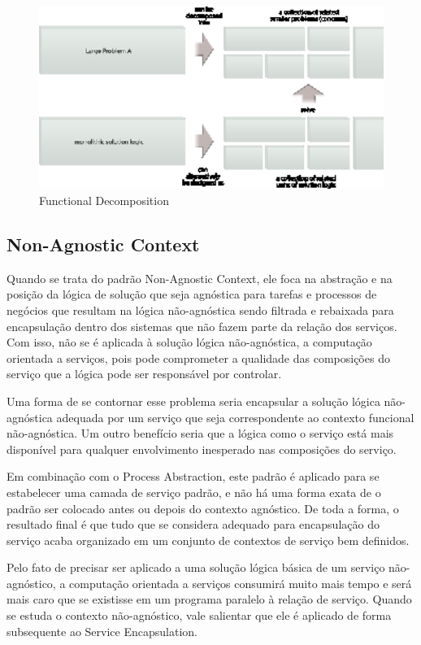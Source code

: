 \documentclass[12pt]{article}
\begin{document}
\begin{figure}[H]
\centering
\includegraphics[width=14cm]{img/fig3.eps}
\caption{Functional Decomposition}
\label{fig:3}
\end{figure}

\subsection{Non-Agnostic Context}

Quando se trata do padrão Non-Agnostic Context, ele foca na abstração e na posição da lógica de solução que seja agnóstica para tarefas e processos de negócios que resultam na lógica não-agnóstica sendo filtrada e rebaixada para encapsulação dentro dos sistemas que não fazem parte da relação dos serviços. Com isso, não se é aplicada à solução lógica não-agnóstica, a computação orientada a serviços, pois pode comprometer a qualidade das composições do serviço que a lógica pode ser responsável por controlar.

Uma forma de se contornar esse problema seria encapsular a solução lógica não-agnóstica adequada por um serviço que seja correspondente ao contexto funcional não-agnóstica. Um outro benefício seria que a lógica como o serviço está mais disponível para qualquer envolvimento inesperado nas composições do serviço.

Em combinação com o Process Abstraction, este padrão é aplicado para se estabelecer uma camada de serviço padrão, e não há uma forma exata de o padrão ser colocado antes ou depois do contexto agnóstico. De toda a forma, o resultado final é que tudo que se considera adequado para encapsulação do serviço acaba organizado em um conjunto de contextos de serviço bem definidos.

Pelo fato de precisar ser aplicado a uma solução lógica básica de um serviço não-agnóstico, a computação orientada a serviços consumirá muito mais tempo e será mais caro que se existisse em um programa paralelo à relação de serviço. Quando se estuda o contexto não-agnóstico, vale salientar que ele é aplicado de forma subsequente ao Service Encapsulation.
\end{document}
